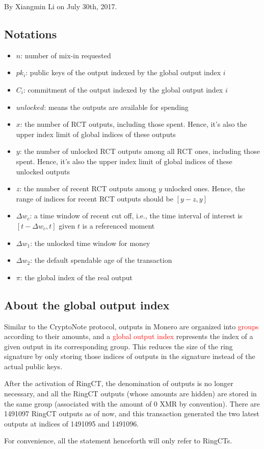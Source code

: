 By Xiangmin Li on July 30th, 2017.
\subsection{Notations}
	\begin{itemize}
		\item \(n\): number of mix-in requested 
		\item \(pk_i\):  public keys of the output indexed by the global output index \(i\) 
		\item \(C_i\):  commitment of the output indexed by the global output index \(i\)
		\item \(unlocked\): means the outputs are available for spending 
		\item \(x\): the number of RCT outputs, including those spent. Hence, it's also the upper index limit of global indices of these outputs 
		\item \(y\): the number of unlocked RCT outputs among all RCT ones, including those spent. Hence, it’s also the upper index limit of global indices of these unlocked outputs 
		\item \(z\): the number of recent RCT outputs among \(y\) unlocked ones. Hence, the range of indices for recent RCT outputs should be \([y−z,y]\)
		\item \(\Delta w_c\):  a time window of recent cut off, i.e., the time interval of interest is \([t-\Delta w_c, t]\) given \(t\) is a referenced moment 
		\item \(\Delta w_1\): the unlocked time window for money \
		\item \(\Delta w_2\): the default spendable age of the transaction 
		\item \(\pi\):  the global index of the real output
	\end{itemize}
\subsection{About the global output index}
Similar to the CryptoNote protocol, outputs in Monero are organized into \textcolor{red}{groups} according to their amounts, and a \textcolor{red}{global output index} represents the index of a given output in its corresponding group. This reduces the size of the ring signature by only storing those indices of outputs in the signature instead of the actual public keys.\par
After the activation of RingCT, the denomination of outputs is no longer necessary, and all the RingCT outputs (whose amounts are hidden) are stored in the same group (associated with the amount of 0 XMR by convention). There are 1491097 RingCT outputs as of now, and this transaction generated the two latest outputs at indices of 1491095 and 1491096.\par
For convenience, all the statement henceforth will only refer to RingCTs.
